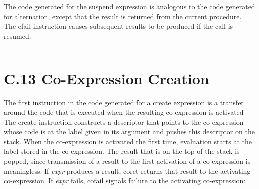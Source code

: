 \bigskip

\begin{center}
\tablelasttail{\hline}
\begin{xtabular}{|m{1.9073598in}|m{2.75596in}|}

\end{xtabular}
\end{center}

The code generated for the suspend expression is analogous to the code
generated for alternation, except that the result is returned from the
current procedure. The efail instruction causes subsequent results to
be produced if the call is resumed:

\begin{center}
\tablelasttail{\hline}
\begin{xtabular}{|m{1.9073598in}|m{2.75596in}|}

\end{xtabular}
\end{center}


\section{C.13 Co-Expression Creation}

The first instruction in the code generated for a create expression is
a transfer around the code that is executed when the resulting
co-expression is activated The create instruction constructs a
descriptor that points to the co-expression whose code is at the label
given in its argument and pushes this descriptor on the stack. When
the co-expression is activated the first time, evaluation starts at
the label stored in the co-expression. The result that is on the top
of the stack is popped, since transmission of a result to the first
activation of a co-expression is meaningless. If \textit{expr}
produces a result, coret returns that result to the activating
co-expression. If \textit{expr} fails, cofail signals failure to the
activating co-expression:

